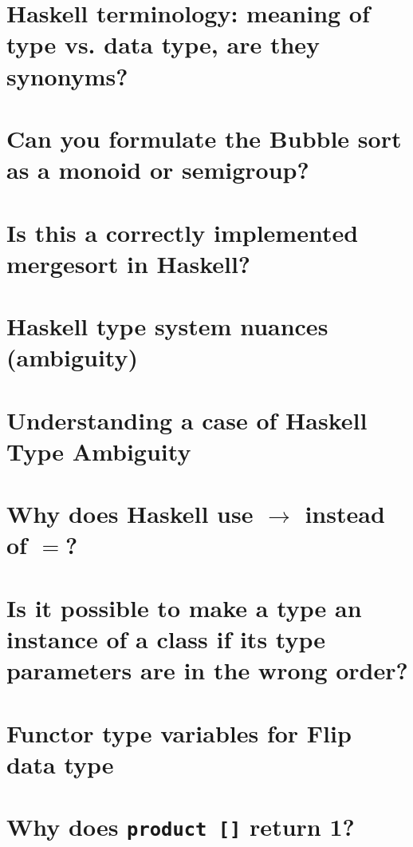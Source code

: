 \documentclass{book}%
\begin{document}
\section{Haskell terminology: meaning of type vs. data type, are they synonyms?}


\section{Can you formulate the Bubble sort as a monoid or semigroup?}


\section{Is this a correctly implemented mergesort in Haskell?}


\section{Haskell type system nuances (ambiguity)}


\section{Understanding a case of Haskell Type Ambiguity}


\section{Why does Haskell use $\to$ instead of $=$?}


\section{Is it possible to make a type an instance of a class if its type parameters are in the wrong order?}


\section{Functor type variables for Flip data type}


\section{Why does {\texttt{product []}} return 1?}

\end{document}
